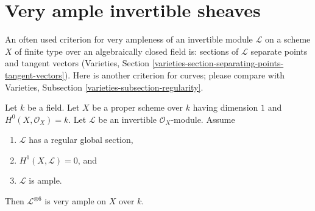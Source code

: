 \section{Very ample invertible sheaves}
\label{section-very-ample}

\noindent
An often used criterion for very ampleness of an invertible module
$\mathcal{L}$ on a scheme $X$ of finite type over an algebraically
closed field is: sections of $\mathcal{L}$ separate points and
tangent vectors (Varieties, Section
\ref{varieties-section-separating-points-tangent-vectors}). Here is another
criterion for curves; please compare with
Varieties, Subsection \ref{varieties-subsection-regularity}.

\begin{lemma}
\label{lemma-criterion-very-ample}
Let $k$ be a field. Let $X$ be a proper scheme over $k$ having dimension $1$
and $H^0(X, \mathcal{O}_X) = k$. Let $\mathcal{L}$ be an invertible
$\mathcal{O}_X$-module. Assume
\begin{enumerate}
\item $\mathcal{L}$ has a regular global section,
\item $H^1(X, \mathcal{L}) = 0$, and
\item $\mathcal{L}$ is ample.
\end{enumerate}
Then $\mathcal{L}^{\otimes 6}$ is very ample on $X$ over $k$.
\end{lemma}

